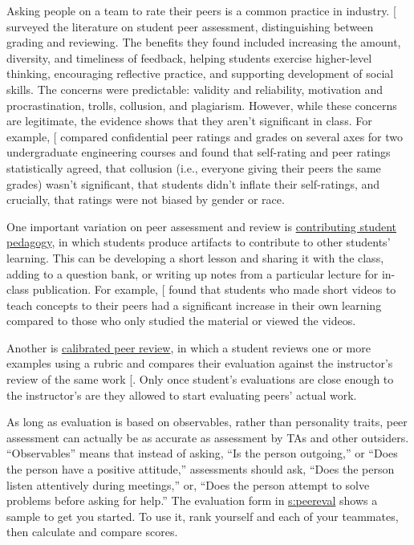 Asking people on a team to rate their peers is a common practice in
industry. {[}\protect[\hyperlink{b:Sond2012}{Sond2012}]{]} surveyed the literature on student peer
assessment, distinguishing between grading and reviewing. The benefits
they found included increasing the amount, diversity, and timeliness of
feedback, helping students exercise higher-level thinking, encouraging
reflective practice, and supporting development of social skills. The
concerns were predictable: validity and reliability, motivation and
procrastination, trolls, collusion, and plagiarism. However, while these
concerns are legitimate, the evidence shows that they aren't significant
in class. For example, {[}\protect[\hyperlink{b:Kauf2000}{Kauf2000}]{]} compared confidential peer
ratings and grades on several axes for two undergraduate engineering
courses and found that self-rating and peer ratings statistically
agreed, that collusion (i.e., everyone giving their peers the same
grades) wasn't significant, that students didn't inflate their
self-ratings, and crucially, that ratings were not biased by gender or
race.

One important variation on peer assessment and review is \protect\hyperlink{g:contributing-student}{contributing
student pedagogy}, in which students produce
artifacts to contribute to other students' learning. This can be
developing a short lesson and sharing it with the class, adding to a
question bank, or writing up notes from a particular lecture for
in-class publication. For example, {[}\protect[\hyperlink{b:Fran2018}{Fran2018}]{]} found that
students who made short videos to teach concepts to their peers had a
significant increase in their own learning compared to those who only
studied the material or viewed the videos.

Another is \protect\hyperlink{g:calibrated-peer-review}{calibrated peer review}, in
which a student reviews one or more examples using a rubric and
compares their evaluation against the instructor's review of the same
work {[}\protect[\hyperlink{b:Kulk2013}{Kulk2013}]{]}. Only once student's evaluations are close
enough to the instructor's are they allowed to start evaluating peers'
actual work.

As long as evaluation is based on observables, rather than personality
traits, peer assessment can actually be as accurate as assessment by TAs
and other outsiders. ``Observables'' means that instead of asking, ``Is the
person outgoing,'' or ``Does the person have a positive attitude,''
assessments should ask, ``Does the person listen attentively during
meetings,'' or, ``Does the person attempt to solve problems before asking
for help.'' The evaluation form in \protect\hyperlink{APPENDIX}{s:peereval} shows a
sample to get you started. To use it, rank yourself and each of your
teammates, then calculate and compare scores.

